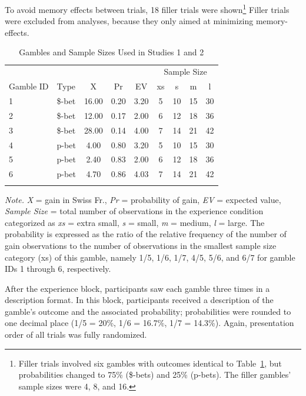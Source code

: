 \documentclass[a4paper, man, natbib, floatsintext]{apa6}
\begin{document}
To avoid memory effects between trials, 18 filler trials were shown\footnote{Filler trials involved six gambles with outcomes identical to Table~\ref{table:Lotteries}, but probabilities changed to 75\% (\$-bets) and 25\% (p-bets). The filler gambles' sample sizes were 4, 8, and 16.} Filler trials were excluded from analyses, because they only aimed at minimizing memory-effects.

\begin{table}[bth]
\begin{center}
\begin{threeparttable}
\caption{Gambles and Sample Sizes Used in Studies 1 and 2\label{table:Lotteries}}
\begin{tabular}{llccccccc}
\toprule
 &  &  &  &  & \multicolumn{4}{c}{Sample Size} \\
\cmidrule(r){6-9}
Gamble ID & Type & X & Pr & EV & xs & s & m & l\\
\midrule
1 & \$-bet & 16.00 & 0.20 & 3.20 & 5 & 10 & 15 & 30\\
2 & \$-bet & 12.00 & 0.17 & 2.00 & 6 & 12 & 18 & 36\\
3 & \$-bet & 28.00 & 0.14 & 4.00 & 7 & 14 & 21 & 42\\
4 & p-bet & 4.00 & 0.80 & 3.20 & 5 & 10 & 15 & 30\\
5 & p-bet & 2.40 & 0.83 & 2.00 & 6 & 12 & 18 & 36\\
6 & p-bet & 4.70 & 0.86 & 4.03 & 7 & 14 & 21 & 42\\
\bottomrule
\addlinespace
\end{tabular}
\begin{tablenotes}[para]
\normalsize{\textit{Note.} \textit{X} = gain in Swiss Fr., \textit{Pr} = probability of gain, \textit{EV} = expected value, \textit{Sample Size} = total number of observations in the experience condition categorized as \textit{xs} = extra small, \textit{s} = small, \textit{m} = medium, \textit{l} = large. The probability is expressed as the ratio of the relative frequency of the number of gain observations to the number of observations in the smallest sample size category (xs) of this gamble, namely 1/5, 1/6, 1/7, 4/5, 5/6, and 6/7 for gamble IDs 1 through 6, respectively.}
\end{tablenotes}
\end{threeparttable}
\end{center}
\end{table}

After the experience block, participants saw each gamble three times in a description format. In this block, participants received a description of the gamble's outcome and the associated probability; probabilities were rounded to one decimal place (1/5 = 20\%, 1/6 = 16.7\%, 1/7 = 14.3\%). Again, presentation order of all trials was fully randomized.
\end{document}
